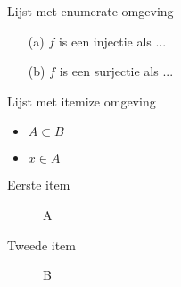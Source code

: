 \documentclass[12pt,a4paper]{article}
\begin{document}
Lijst met enumerate omgeving
\begin{enumerate}
\item[(a)] $f$ is een injectie als ...
\item[(b)] $f$ is een surjectie als ...
\end{enumerate}

Lijst met itemize omgeving
\begin{itemize}
\item $A \subset B$
\item $x \in A$
\end{itemize}

\begin{description}
	\item[Eerste item]  A
	\item[Tweede item] B
\end{description}
\end{document}
